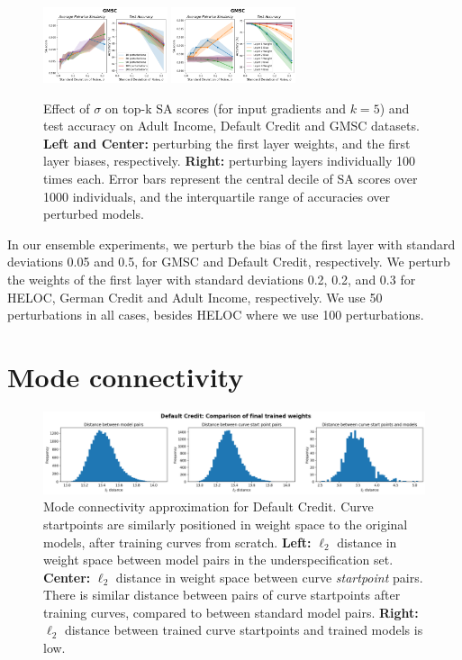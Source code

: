 \begin{figure}[t]
    \includegraphics[width=0.325\textwidth]{figures/perturb_gmsc_samples_bias.png}
    \includegraphics[width=0.325\textwidth]{figures/perturb_gmsc_layers.png}
    \caption{\small Effect of $\sigma$ on top-k SA scores (for input gradients and $k=5$) and test accuracy on Adult Income, Default Credit and GMSC datasets. \textbf{Left and Center:} perturbing the first layer weights, and the first layer biases, respectively. \textbf{Right:} perturbing layers individually 100 times each. Error bars represent the central decile of SA scores over 1000 individuals, and the interquartile range of accuracies over perturbed models.}
    \label{fig:perturb2}
\end{figure}

In our ensemble experiments, we perturb the bias of the first layer with standard deviations 0.05 and 0.5, for GMSC and Default Credit, respectively. We perturb the weights of the first layer with standard deviations 0.2, 0.2, and 0.3 for HELOC, German Credit and Adult Income, respectively. We use 50 perturbations in all cases, besides HELOC where we use 100 perturbations.

\section{Mode connectivity}
\label{app:mode}

\begin{figure}[b]
    \centering
    \includegraphics[width=\textwidth]{figures/modconn_approx.png}
    \caption{\small Mode connectivity approximation for Default Credit. Curve startpoints are similarly positioned in weight space to the original models, after training curves from scratch. \textbf{Left:} $\ell_2$ distance in weight space between model pairs in the underspecification set. \textbf{Center:} $\ell_2$ distance in weight space between curve \textit{startpoint} pairs. There is similar distance between pairs of curve startpoints after training curves, compared to between standard model pairs. \textbf{Right:} $\ell_2$ distance between trained curve startpoints and trained models is low.}
    \label{fig:modconn_approx}
\end{figure}

